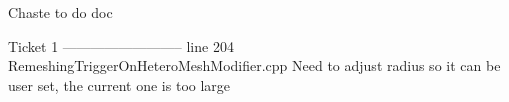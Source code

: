 Chaste to do doc


Ticket 1
--------------------------
line 204 RemeshingTriggerOnHeteroMeshModifier.cpp
Need to adjust radius so it can be user set, the current one is too large 